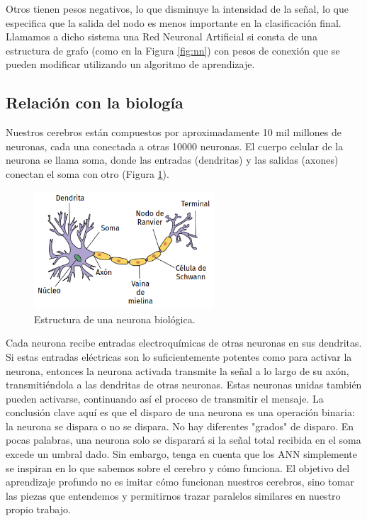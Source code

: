 \documentclass[a4paper,12pt]{article}
\begin{document}
Otros tienen pesos negativos, lo que disminuye la intensidad de la señal, lo que especifica que la salida del nodo es menos importante en la clasificación final. Llamamos a dicho sistema una Red Neuronal Artificial si consta de una estructura de grafo (como en la Figura \ref{fig:nn}) con pesos de conexión que se pueden modificar utilizando un algoritmo de aprendizaje.

\subsection{Relación con la biología}
Nuestros cerebros están compuestos por aproximadamente 10 mil millones de neuronas, cada una conectada a otras 10000 neuronas. El cuerpo celular de la neurona se llama soma, donde las entradas (dendritas) y las salidas (axones) conectan el soma con otro (Figura \ref{fig:realneuron}).

\begin{figure}[H]
	\begin{center}				
		\includegraphics[width=0.6\textwidth]{019.png}
		\caption{Estructura de una neurona biológica. \citep{neurona_wiki}}
		\label{fig:realneuron}
	\end{center}
\end{figure}

Cada neurona recibe entradas electroquímicas de otras neuronas en sus dendritas. Si estas entradas eléctricas son lo suficientemente potentes como para activar la neurona, entonces la neurona activada transmite la señal a lo largo de su axón, transmitiéndola a las dendritas de otras neuronas. Estas neuronas unidas también pueden activarse, continuando así el proceso de transmitir el mensaje.
La conclusión clave aquí es que el disparo de una neurona es una operación binaria: la neurona se dispara o no se dispara. No hay diferentes "grados" de disparo. En pocas palabras, una neurona solo se disparará si la señal total recibida en el soma excede un umbral dado.
Sin embargo, tenga en cuenta que los ANN simplemente se inspiran en lo que sabemos sobre el cerebro y cómo funciona. El objetivo del aprendizaje profundo no es imitar cómo funcionan nuestros cerebros, sino tomar las piezas que entendemos y permitirnos trazar paralelos similares en nuestro propio trabajo.
\end{document}
